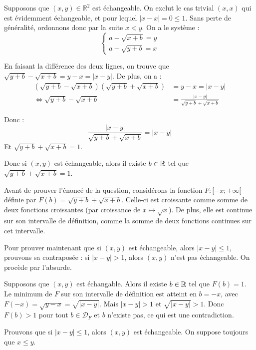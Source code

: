 \documentclass[]{../templates/homework}
\begin{document}
Supposons que $(x,y) \in \mathbb R^2$ est échangeable. On exclut le cas trivial $(x,x)$ qui est évidemment échangeable, et pour lequel $|x-x| = 0 \leq 1$. Sans perte de généralité, ordonnons donc par la suite $x < y$. On a le système :
\begin{equation*}
	\begin{cases}
		a - \sqrt{x+b} = y \\
		a - \sqrt{y+b} = x
	\end{cases}
\end{equation*}

En faisant la différence des deux lignes, on trouve que $\sqrt{y+b} - \sqrt{x+b} = y-x = |x-y|$. De plus, on a :
\begin{equation*}
	\begin{split}
		(\sqrt{y+b} - \sqrt{x+b})(\sqrt{y+b} + \sqrt{x+b}) & =y-x = |x-y|                             \\
		\iff \sqrt{y+b} - \sqrt{x+b}                       & = \frac {|x-y|}{\sqrt{y+b} + \sqrt{x+b}}
	\end{split}
\end{equation*}

Donc : $$\frac {|x-y|}{\sqrt{y+b} + \sqrt{x+b}} = |x-y|$$
Et $\sqrt{y+b} + \sqrt{x+b} = 1$.

Donc si $(x,y)$ est échangeable, alors il existe $b\in\mathbb R$ tel que $\sqrt{y+b} + \sqrt{x+b} = 1$.

Avant de prouver l'énoncé de la question, considérons la fonction $F: [-x;+\infty[$ définie par $F(b) = \sqrt{y+b} + \sqrt{x+b}$. Celle-ci est croissante comme somme de deux fonctions croissantes (par croissance de $x\mapsto \sqrt x$). De plus, elle est continue sur son intervalle de définition, comme la somme de deux fonctions continues sur cet intervalle.

Pour prouver maintenant que si $(x,y)$ est échangeable, alors $|x-y| \leq 1$, prouvons sa contraposée : si $|x-y| > 1$, alors $(x,y)$ n'est pas échangeable. On procède par l'absurde.

Supposons que $(x,y)$ est échangable. Alors il existe $b\in\mathbb R$ tel que $F(b) = 1$. Le minimum de $F$ sur son intervalle de définition est atteint en $b=-x$, avec $F(-x) = \sqrt{y-x} = \sqrt{|x-y|}$. Mais $|x-y| > 1$ et $\sqrt{|x-y|} > 1$. Donc $F(b) > 1$ pour tout $b\in \mathcal D_F$ et $b$ n'existe pas, ce qui est une contradiction.

\subproblem
Prouvons que si $|x-y| \leq 1$, alors $(x,y)$ est échangeable. On suppose toujours que $x \leq y$.
\end{document}
